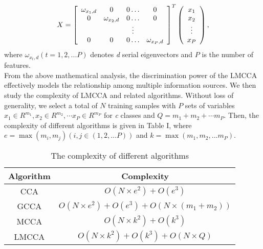 \documentclass[journal]{IEEEtran}
\begin{document}
\begin{equation}
X = {\left[ {\begin{array}{*{20}{c}}
   {{\omega _{{x_1},d}}} & 0 & {0 \ldots } & 0  \\
   0 & {{\omega _{{x_2},d}}} & {0 \ldots } & 0  \\
   {} & {} &  \vdots  & {}  \\
   0 & 0 & {0 \ldots } & {{\omega _{{x_P},d}}}  \\
\end{array}} \right]^T}\left( {\begin{array}{*{20}{c}}
   {{x_1}}  \\
   {{x_2}}  \\
    \vdots   \\
   {{x_P}}  \\
\end{array}} \right){\rm{ }},
\end{equation}
where $\omega _{{x_t},d} (t=1,2,...P)$ denotes \textit{d} serial eigenvectors and $P$ is the number of features.\\\indent From the above mathematical analysis, the discrimination power of the LMCCA effectively models the relationship among multiple information sources. We then study the complexity of LMCCA and related algorithms. Without loss of generality, we select a total of $N$ training samples with \emph{$ P $} sets of variables ${x_1} \in {R^{{m_1}}},{x_2} \in {R^{{m_2}}}, \cdots {x_P} \in {R^{{m_P}}}$ for \emph{c} classes and $Q = {m_1} + {m_2} +  \cdots {m_P} $. Then, the complexity of different algorithms is given in Table I, where
$ e = \max ({m_i},{m_j})(i,j \in (1,2,...P))$ and $k = \max ({m_1},{m_2},...{m_P})$.\\\indent
\vspace*{-10pt}
\begin{table}[h]
\small
\renewcommand{\arraystretch}{1.3}
\caption{\normalsize{The complexity of different algorithms}}
\setlength{\abovecaptionskip}{0pt}
\setlength{\belowcaptionskip}{10pt}
\centering
\tabcolsep 0.073in
\begin{tabular}{cc}
\hline
Algorithm & Complexity\\
\hline
CCA & $O(N \times e^2) +O(e^3)$\\
GCCA &$O(N \times e^2) +O(e^3)+ O(N \times (m_1+m_2)) $\\
MCCA &$O(N \times k^2) +O(k^3)$\\
LMCCA &$O(N \times k^2) +O(k^3)+ O(N \times Q) $\\
\hline
\end{tabular}
\end{table}\\
\end{document}
